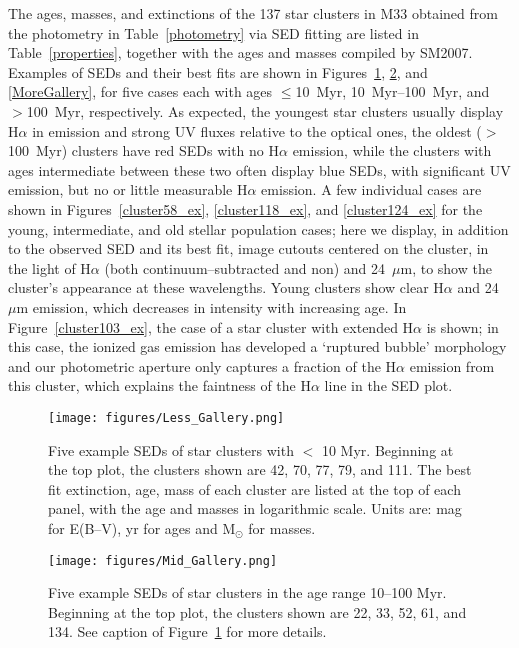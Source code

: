 \documentclass{aastex63}
\begin{document}
The ages, masses, and extinctions of the 137 star clusters in M33 obtained from the photometry in Table~\ref{photometry} via SED fitting are listed in Table~\ref{properties}, together with the ages and masses compiled by SM2007. Examples of SEDs and their best fits are shown in Figures~\ref{LessGallery}, \ref{MidGallery}, and \ref{MoreGallery}, for five cases each with ages $\leq$10~Myr, 10~Myr--100~Myr, and $>$100~Myr, respectively. As expected, the youngest star clusters usually display H$\alpha$ in emission and strong UV fluxes relative to the optical ones, the oldest ($>$100~Myr) clusters have red SEDs with no H$\alpha$ emission, while the clusters with ages intermediate between these two often display blue SEDs, with significant  UV emission, but no or little measurable H$\alpha$ emission. A few individual cases are shown in Figures~\ref{cluster58_ex}, \ref{cluster118_ex}, and \ref{cluster124_ex} for the young, intermediate, and old stellar population cases; here we display, in addition to the observed SED and its best fit, image cutouts centered on the cluster, in the light of H$\alpha$ (both continuum--subtracted and non) and 24~$\mu$m, to show the cluster's appearance at these wavelengths. Young clusters show clear H$\alpha$ and 24~$\mu$m emission, which decreases in intensity with increasing age. In Figure~\ref{cluster103_ex}, the case of a star cluster with extended H$\alpha$ is shown; in this case, the ionized gas emission has developed a `ruptured bubble' morphology and our photometric aperture only captures a fraction of the H$\alpha$ emission from this cluster, which explains the faintness of the H$\alpha$ line in the SED plot. 

\begin{figure}[ht]
 \centering
 \texttt{[image: figures/Less\_Gallery.png]}
    \caption{Five example SEDs of star clusters with $<$ 10 Myr. Beginning at the top plot, the clusters shown are 42, 70, 77, 79, and 111. The best fit extinction, age, mass of each cluster are  listed at the top of each panel, with  the age and masses in logarithmic scale. Units are:  mag for E(B--V), yr for ages and M$_{\odot}$ for masses.}
        \label{LessGallery}
\end{figure}

\begin{figure}[ht]
 \centering
 \texttt{[image: figures/Mid\_Gallery.png]}
    \caption{Five example SEDs of star clusters in the age range 10--100 Myr. Beginning at the top plot, the clusters shown are 22, 33, 52, 61, and 134. See caption of Figure~\ref{LessGallery} for more details. }
        \label{MidGallery}
\end{figure}
\end{document}
